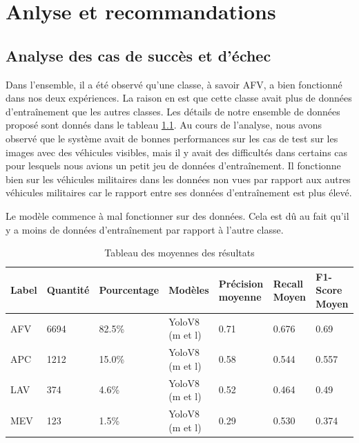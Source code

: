 \chapter{Anlyse et recommandations}
\label{chap:4}
\sloppy

\section{Analyse des cas de succès et d'échec}

Dans l'ensemble, il a été observé qu'une classe, à savoir AFV, a bien fonctionné dans nos deux expériences.
La raison en est que cette classe avait plus de données d'entraînement que les autres classes.
Les détails de notre ensemble de données proposé sont donnés dans le tableau \ref{tab:label_data}.
Au cours de l'analyse, nous avons observé que le système avait de bonnes performances sur les cas de test sur les images avec des véhicules visibles, mais il y avait des difficultés dans certains cas pour lesquels nous avions un petit jeu de données d'entraînement.
Il fonctionne bien sur les véhicules militaires dans les données non vues par rapport aux autres véhicules militaires car le rapport entre ses données d'entraînement est plus élevé.

Le modèle commence à mal fonctionner sur des données. Cela est dû au fait qu'il y a moins de données d'entraînement par rapport à l'autre classe.

\begin{table}[h]
    \centering
    \begin{tabular}{|l|l|l|p{2.8cm}|p{2cm}|p{2cm}|p{2cm}|}
        \hline
        \textbf{Label} & \textbf{Quantité} & \textbf{Pourcentage} & \textbf{Modèles} & \textbf{Précision moyenne} & \textbf{Recall Moyen} & \textbf{F1-Score Moyen} \\ \hline
        AFV            & 6694              & 82.5\%               & YoloV8 (m et l)  & 0.71                       & 0.676                 & 0.69                    \\ \hline
        APC            & 1212              & 15.0\%               & YoloV8 (m et l)  & 0.58                       & 0.544                 & 0.557                   \\ \hline
        LAV            & 374               & 4.6\%                & YoloV8 (m et l)  & 0.52                       & 0.464                 & 0.49                    \\ \hline
        MEV            & 123               & 1.5\%                & YoloV8 (m et l)  & 0.29                       & 0.530                 & 0.374                   \\ \hline
    \end{tabular}
    \caption{Tableau des moyennes des résultats}
    \label{tab:label_data}
\end{table}


